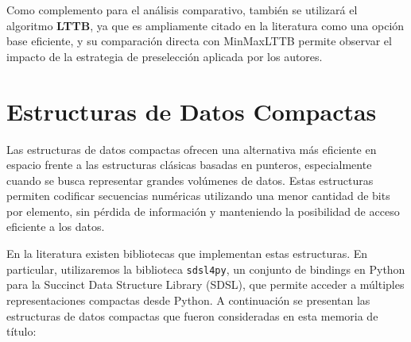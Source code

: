 Como complemento para el análisis comparativo, también se utilizará el algoritmo \textbf{LTTB}, ya que es ampliamente citado en la literatura como una opción base eficiente, y su comparación directa con MinMaxLTTB permite observar el impacto de la estrategia de preselección aplicada por los autores.

\newpage
\section{Estructuras de Datos Compactas}

Las estructuras de datos compactas ofrecen una alternativa más eficiente en espacio frente a las estructuras clásicas basadas en punteros, especialmente cuando se busca representar grandes volúmenes de datos. Estas estructuras permiten codificar secuencias numéricas utilizando una menor cantidad de bits por elemento, sin pérdida de información y manteniendo la posibilidad de acceso eficiente a los datos.

En la literatura existen bibliotecas que implementan estas estructuras. En particular, utilizaremos la biblioteca \texttt{sdsl4py}\cite{sdsl4py2024}, un conjunto de bindings en Python para la Succinct Data Structure Library (SDSL)\cite{gbmp2014sea}, que permite acceder a múltiples representaciones compactas desde Python. A continuación se presentan las estructuras de datos compactas que fueron consideradas en esta memoria de título:

